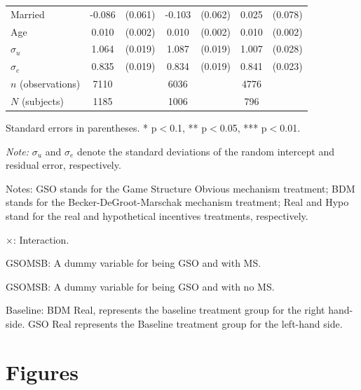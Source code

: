 \documentclass[12pt]{article}
\newcommand{\sym}[1]{\rlap{$^{#1}$}}
\begin{document}
\begin{table}[H]
{\begin{tabular}{l*{3}{cc}}
Married     &      -0.086         &     (0.061)&      -0.103\sym{*}  &     (0.062)&       0.025         &     (0.078)\\
Age         &       0.010\sym{***}&     (0.002)&       0.010\sym{***}&     (0.002)&       0.010\sym{***}&     (0.002)\\
$\sigma_u$     &       1.064\sym{***}&     (0.019)&       1.087\sym{***}&     (0.019)&       1.007\sym{***}&     (0.028)\\
$\sigma_e$    &       0.835\sym{***}&     (0.019)&       0.834\sym{***}&     (0.019)&       0.841\sym{***}&     (0.023)\\
\hline
\(n\) (observations)       &        7110         &            &        6036         &            &        4776         &            \\
\(N\) (subjects)       &        1185         &            &       1006         &            &        796        &            \\
\hline\hline
\end{tabular}
}


\begin{tablenotes}
            \footnotesize
            \item Standard errors in parentheses. * p$<$0.1, ** p$<$0.05, *** p$<$0.01.
            \item \textit{Note:} $\sigma_u$ and $\sigma_e$ denote the standard deviations of the random intercept and residual error, respectively.
            \item Notes: GSO stands for the Game Structure Obvious mechanism treatment; BDM stands for the Becker-DeGroot-Marschak mechanism treatment; Real and Hypo stand for the real and hypothetical incentives treatments, respectively.
           \item $\times$: Interaction.
           \item GSOMSB: A dummy variable for being GSO and with MS.
           \item GSOMSB: A dummy variable for being GSO and with no MS.
           \item Baseline: BDM Real, represents the baseline treatment group for the right hand-side.
           GSO Real represents the Baseline treatment group for the left-hand side.
        \end{tablenotes}

\end{table}

\clearpage

\section{Figures}
\end{document}
